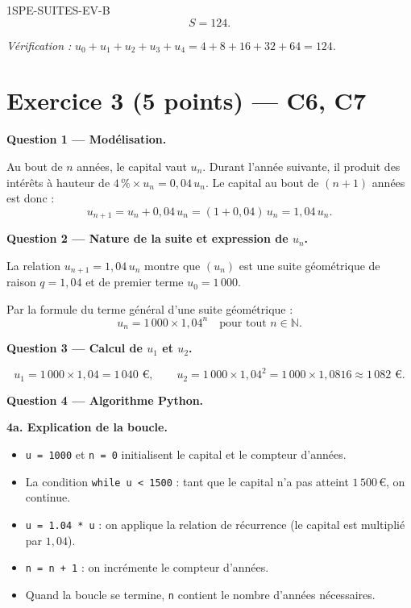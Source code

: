 \begin{corrige}{1SPE-SUITES-EV-B}
\[
  \boxed{S = 124.}
\]

\textit{Vérification :} $u_0 + u_1 + u_2 + u_3 + u_4 = 4 + 8 + 16 + 32 + 64 = 124$. \checkmark

\section*{Exercice 3 \hfill (5 points) — C6, C7}


\bigskip
\textbf{Question 1 — Modélisation.}


Au bout de $n$ années, le capital vaut $u_n$. Durant l'année suivante, il produit des intérêts à hauteur de $4\,\% \times u_n = 0{,}04\,u_n$. Le capital au bout de $(n+1)$ années est donc :
\[
  u_{n+1} = u_n + 0{,}04\,u_n = (1 + 0{,}04)\,u_n = 1{,}04\,u_n.
\]

\medskip
\textbf{Question 2 — Nature de la suite et expression de $u_n$.}


La relation $u_{n+1} = 1{,}04\,u_n$ montre que $(u_n)$ est une suite géométrique de raison $q = 1{,}04$ et de premier terme $u_0 = 1\,000$.

Par la formule du terme général d'une suite géométrique :
\[
  \boxed{u_n = 1\,000 \times 1{,}04^n} \quad \text{pour tout } n \in \mathbb{N}.
\]

\medskip
\textbf{Question 3 — Calcul de $u_1$ et $u_2$.}

\[
  u_1 = 1\,000 \times 1{,}04 = 1\,040 \text{ €}, \qquad
  u_2 = 1\,000 \times 1{,}04^2 = 1\,000 \times 1{,}0816 \approx 1\,082 \text{ €}.
\]

\medskip
\textbf{Question 4 — Algorithme Python.}

\textbf{4a. Explication de la boucle.}


\begin{itemize}
  \item \texttt{u = 1000} et \texttt{n = 0} initialisent le capital et le compteur d'années.
  \item La condition \texttt{while u < 1500} : tant que le capital n'a pas atteint $1\,500$\,€, on continue.
  \item \texttt{u = 1.04 * u} : on applique la relation de récurrence (le capital est multiplié par $1{,}04$).
  \item \texttt{n = n + 1} : on incrémente le compteur d'années.
  \item Quand la boucle se termine, \texttt{n} contient le nombre d'années nécessaires.
\end{itemize}


\end{corrige}
